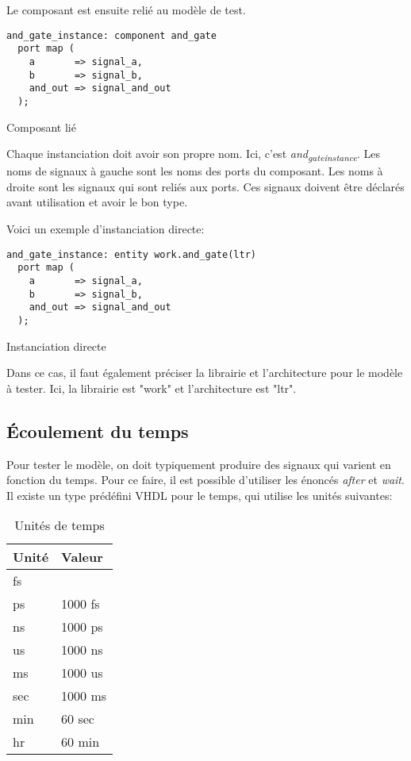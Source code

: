 \documentclass[11pt]{article}
\begin{document}
Le composant est ensuite relié au modèle de test. 

\begin{listing}[htbp]
\begin{verbatim}
and_gate_instance: component and_gate
  port map (
    a       => signal_a,
    b       => signal_b,
    and_out => signal_and_out
  );
\end{verbatim}
\caption{Composant lié}
\end{listing}

Chaque instanciation doit avoir son propre nom. Ici, c'est
\emph{and\textsubscript{gate}\textsubscript{instance}}. Les noms de signaux à gauche sont les noms des
ports du composant. Les noms à droite sont les signaux qui sont reliés
aux ports. Ces signaux doivent être déclarés avant utilisation et
avoir le bon type.

Voici un exemple d'instanciation directe:

\begin{listing}[htbp]
\begin{verbatim}
and_gate_instance: entity work.and_gate(ltr)
  port map (
    a       => signal_a,
    b       => signal_b,
    and_out => signal_and_out
  );
\end{verbatim}
\caption{Instanciation directe}
\end{listing}

Dans ce cas, il faut également préciser la librairie et l'architecture
pour le modèle à tester. Ici, la librairie est "work" et
l'architecture est "ltr".

\subsection{Écoulement du temps}
\label{sec:orgd7a5c4f}

Pour tester le modèle, on doit typiquement produire des signaux qui
varient en fonction du temps. Pour ce faire, il est possible
d'utiliser les énoncés \emph{after} et \emph{wait}. Il existe un type prédéfini
VHDL pour le temps, qui utilise les unités suivantes:

\begin{table}[htbp]
\caption{\label{tab:org97dfeab}Unités de temps}
\centering
\begin{tabular}{ll}
Unité & Valeur\\
\hline
fs & \\
ps & 1000 fs\\
ns & 1000 ps\\
us & 1000 ns\\
ms & 1000 us\\
sec & 1000 ms\\
min & 60 sec\\
hr & 60 min\\
\end{tabular}
\end{table}
\end{document}
